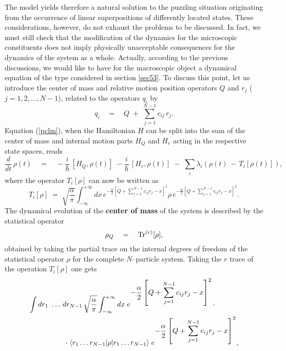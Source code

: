 \documentclass[10pt,a4paper]{article}
\begin{document}
The model yields therefore a natural solution to the puzzling
situation originating from the occurrence of linear superpositions
of differently located states. These considerations, however, do
not exhaust the problems to be discussed. In fact, we must still
check that the modification of the dynamics for the microscopic
constituents does not imply physically unacceptable consequences
for the dynamics of the system as a whole. Actually, according to
the previous discussions, we would like to have for the
macroscopic object a dynamical equation of the type considered in
section \ref{sec53}. To discuss this point, let us introduce the
center  of mass and relative motion position operators $Q$ and
$r_{j}$ ($j=1,2,...,N-1$), related to the operators $q_{i}$ by
\begin{equation}
q_{i} \quad = \quad  Q \; + \; \sum_{j=1}^{N-1} c_{ij}\, r_{j}.
\end{equation}
Equation (\ref{pclm}), when the Hamiltonian $H$ can be split into
the sum of the center   of mass and internal motion parts $H_{Q}$
and $H_{r}$ acting in the respective state spaces, reads
\begin{equation} \label{pclm2}
\frac{d}{dt}\, \rho(t) \quad = \quad -\frac{i}{\hbar}\, [H_{Q},
\rho(t)] \; -\frac{i}{\hbar}\, [H_{r}, \rho(t)] \; - \; \sum_{i}
\lambda_{i} \left( \rho(t) \, - \, T_{i}[\rho(t)]\right),
\end{equation}
where the operator $T_{i}[\rho]$ can now be written as
\begin{equation}
T_{i}[\rho] \; = \; \sqrt{\frac{\alpha}{\pi}}
\int_{-\infty}^{+\infty} dx\, e^{\displaystyle -\frac{\alpha}{2}
\left[Q + \sum_{j=1}^{N-1} c_{ij} r_{j} - x \right]^{2}} \rho\,
 e^{\displaystyle -\frac{\alpha}{2}
\left[Q + \sum_{j=1}^{N-1} c_{ij} r_{j} - x \right]^{2}}.
\end{equation}
The dynamical evolution of the {\bf center of mass}  of the system
is described by the statistical operator
\begin{equation}
\rho_{Q} \quad = \quad \makebox{Tr}^{(r)}[\rho],
\end{equation}
obtained by taking the partial trace on the internal degrees of
freedom of the statistical operator $\rho$ for the complete
$N$--particle system. Taking the $r$ trace of the operation
$T_{i}[\rho]$ one gets
\begin{eqnarray}
\lefteqn{ \int dr_{1}\ \ldots \, dr_{N-1}\,
\sqrt{\frac{\alpha}{\pi}} \int_{-\infty}^{+\infty} dx \;
e^{\displaystyle -\frac{\alpha}{2} \left[Q + \sum_{j=1}^{N-1}
c_{ij} r_{j} - x \right]^{2}}\,
\cdot\qquad\qquad} \nonumber \\
& & \qquad\qquad \cdot\; \langle r_{1} \ldots r_{N-1}|\rho|r_{1}
\ldots r_{N-1}\rangle\; e^{\displaystyle -\frac{\alpha}{2} \left[Q
+ \sum_{j=1}^{N-1} c_{ij} r_{j} - x \right]^{2}},
\end{eqnarray}
\end{document}
